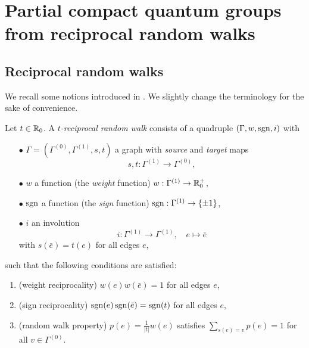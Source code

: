 





\section{Partial compact quantum groups from reciprocal random walks}

\subsection{Reciprocal random walks}

We recall some notions introduced in \cite{DCY1}. We slightly change the terminology for the sake of convenience.

\begin{Def} Let $t\in \mathbb{R}_0$. A \emph{$t$-reciprocal random walk} consists of a quadruple $(\Gamma,w,\operatorname{\mathrm{sgn}},i)$ with \begin{itemize}
\item[$\bullet$] $\Gamma=(\Gamma^{(0)},\Gamma^{(1)},s,t)$ a graph with \emph{source} and \emph{target} maps \[s,t:\Gamma^{(1)}\rightarrow \Gamma^{(0)},\]
\item[$\bullet$] $w$ a function (the \emph{weight} function) $w:\Gamma^{(1)}\rightarrow \mathbb{R}_0^+$,
\item[$\bullet$] $\operatorname{\mathrm{sgn}}$ a function (the \emph{sign} function) $\operatorname{\mathrm{sgn}}:\Gamma^{(1)}\rightarrow \{\pm 1\}$,
\item[$\bullet$] $i$ an involution \[i:\Gamma^{(1)} \rightarrow \Gamma^{(1)},\quad e\mapsto \overline{e}\] with $s(\bar{e}) = t(e)$ for all edges $e$,
\end{itemize}
such that the following conditions are satisfied:
\begin{enumerate}[label=(\arabic*)]
\item (weight reciprocality) $w(e)w(\bar{e}) = 1$ for all edges $e$,
\item (sign reciprocality) $\operatorname{\mathrm{sgn}}(e)\operatorname{\mathrm{sgn}}(\bar{e}) = \operatorname{\mathrm{sgn}}(t)$ for all edges $e$,
\item (random walk property) $p(e) = \frac{1}{|t|}w(e)$ satisfies $\sum_{s(e)=v} p(e) = 1$ for all $v\in \Gamma^{(0)}$.
\end{enumerate}
\end{Def}

